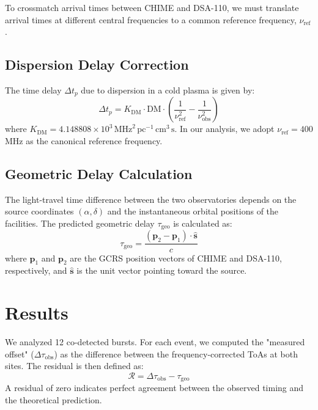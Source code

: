 \documentclass[twocolumn]{aastex631}
\begin{document}
To crossmatch arrival times between CHIME and DSA-110, we must translate arrival times at different central frequencies to a common reference frequency, $\nu_{\text{ref}}$.

\subsection{Dispersion Delay Correction}

The time delay $\Delta t_{p}$ due to dispersion in a cold plasma is given by:
\begin{equation}
    \Delta t_{p} = K_{\text{DM}} \cdot \text{DM} \cdot \left( \frac{1}{\nu_{\text{ref}}^2} - \frac{1}{\nu_{\text{obs}}^2} \right)
\end{equation}
where $K_{\text{DM}} = 4.148808 \times 10^3 \, \text{MHz}^2 \, \text{pc}^{-1} \, \text{cm}^3 \, \text{s}$. In our analysis, we adopt $\nu_{\text{ref}} = 400$ MHz as the canonical reference frequency.

\subsection{Geometric Delay Calculation}

The light-travel time difference between the two observatories depends on the source coordinates $(\alpha, \delta)$ and the instantaneous orbital positions of the facilities. The predicted geometric delay $\tau_{\text{geo}}$ is calculated as:
\begin{equation}
    \tau_{\text{geo}} = \frac{(\mathbf{p}_2 - \mathbf{p}_1) \cdot \mathbf{\hat{s}}}{c}
\end{equation}
where $\mathbf{p}_1$ and $\mathbf{p}_2$ are the GCRS position vectors of CHIME and DSA-110, respectively, and $\mathbf{\hat{s}}$ is the unit vector pointing toward the source.

\section{Results} \label{sec:results}

We analyzed 12 co-detected bursts. For each event, we computed the "measured offset" ($\Delta \tau_{\text{obs}}$) as the difference between the frequency-corrected ToAs at both sites. The residual is then defined as:
\begin{equation}
    \mathcal{R} = \Delta \tau_{\text{obs}} - \tau_{\text{geo}}
\end{equation}
A residual of zero indicates perfect agreement between the observed timing and the theoretical prediction.
\end{document}
